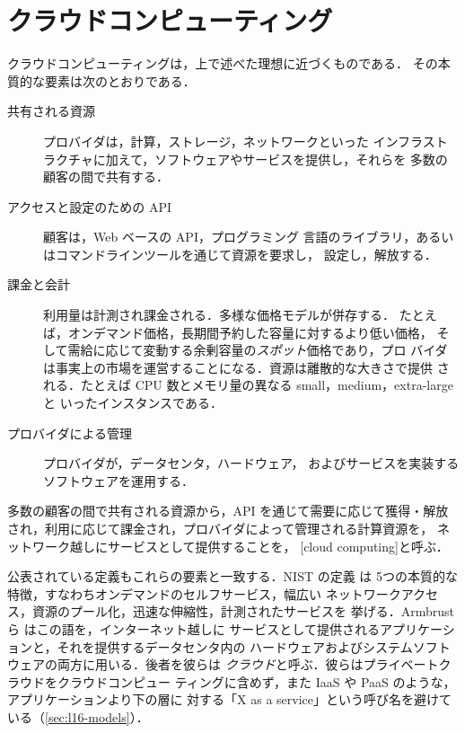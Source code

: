 \documentclass[../main.tex]{subfiles}
\begin{document}
\section{クラウドコンピューティング}
\label{sec:l16-cloud}

クラウドコンピューティングは，上で述べた理想に近づくものである．
その本質的な要素は次のとおりである．
\begin{description}
  \item[共有される資源] プロバイダは，計算，ストレージ，ネットワークといった
    インフラストラクチャに加えて，ソフトウェアやサービスを提供し，それらを
    多数の顧客の間で共有する．
  \item[アクセスと設定のための API] 顧客は，Web ベースの API，プログラミング
    言語のライブラリ，あるいはコマンドラインツールを通じて資源を要求し，
    設定し，解放する．
  \item[課金と会計] 利用量は計測され課金される．多様な価格モデルが併存する．
    たとえば，オンデマンド価格，長期間予約した容量に対するより低い価格，
    そして需給に応じて変動する余剰容量の\emph{スポット}価格であり，プロ
    バイダは事実上の市場を運営することになる．資源は離散的な大きさで提供
    される．たとえば CPU 数とメモリ量の異なる small，medium，extra-large と
    いったインスタンスである．
  \item[プロバイダによる管理] プロバイダが，データセンタ，ハードウェア，
    およびサービスを実装するソフトウェアを運用する．
\end{description}

\begin{definition}[クラウドコンピューティング]
  多数の顧客の間で共有される資源から，API を通じて需要に応じて獲得・解放
  され，利用に応じて課金され，プロバイダによって管理される計算資源を，
  ネットワーク越しにサービスとして提供することを，
  [cloud computing]と呼ぶ．
\end{definition}

\begin{note}
  公表されている定義もこれらの要素と一致する．NIST の定義 \cite{mell2011} は
  5つの本質的な特徴，すなわちオンデマンドのセルフサービス，幅広い
  ネットワークアクセス，資源のプール化，迅速な伸縮性，計測されたサービスを
  挙げる．Armbrust ら \cite{armbrust2009} はこの語を，インターネット越しに
  サービスとして提供されるアプリケーションと，それを提供するデータセンタ内の
  ハードウェアおよびシステムソフトウェアの両方に用いる．後者を彼らは
  \emph{クラウド}と呼ぶ．彼らはプライベートクラウドをクラウドコンピュー
  ティングに含めず，また IaaS や PaaS のような，アプリケーションより下の層に
  対する「X as a service」という呼び名を避けている（\cref{sec:l16-models}）．
\end{note}
\end{document}
